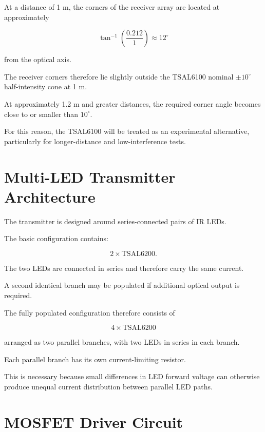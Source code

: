 \documentclass[a4paper,12pt]{article}
\begin{document}
At a distance of 1 m, the corners of the receiver array are located at
approximately

\[
\tan^{-1}
\left(
\frac{0.212}{1}
\right)
\approx
12^\circ
\]

from the optical axis.

The receiver corners therefore lie slightly outside the TSAL6100
nominal \(\pm10^\circ\) half-intensity cone at 1 m.

At approximately 1.2 m and greater distances, the required corner angle
becomes close to or smaller than \(10^\circ\).

For this reason, the TSAL6100 will be treated as an experimental
alternative, particularly for longer-distance and low-interference
tests.



\section{Multi-LED Transmitter Architecture}

The transmitter is designed around series-connected pairs of IR LEDs.

The basic configuration contains:

\[
2 \times \text{TSAL6200}.
\]

The two LEDs are connected in series and therefore carry the same
current.

A second identical branch may be populated if additional optical
output is required.

The fully populated configuration therefore consists of

\[
4 \times \text{TSAL6200}
\]

arranged as two parallel branches, with two LEDs in series in each
branch.

Each parallel branch has its own current-limiting resistor.

This is necessary because small differences in LED forward voltage
can otherwise produce unequal current distribution between parallel
LED paths.



\section{MOSFET Driver Circuit}
\end{document}
